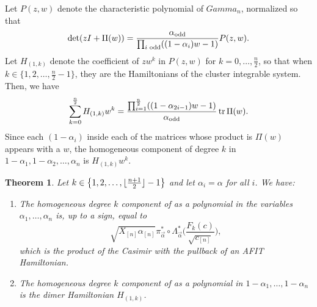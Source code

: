 \documentclass[10pt,a4paper]{amsart}
\numberwithin{equation}{section}
\newtheorem{Theorem}{Theorem}[section]
\DeclarePairedDelimiter\floor{\lfloor}{\rfloor}
\newcommand{\la}{\label}
\DeclareMathOperator{\tr}{tr}
\def\Gamma{Gamma}
\begin{document}
	
	Let $P(z,w)$ denote the characteristic polynomial of $\Gamma_n$, normalized so that
	\[
	\det (zI + \Pi(w))=\frac{ \alpha_{{\rm odd}}}{\prod_{i \text{ odd} }^{} ((1-\alpha_{i})w-1)} P(z,w).
	\]
	Let $H_{(1,k)}$ denote the coefficient of $z w^k$ in $P(z,w)$ for $k=0,\dots,\frac n 2 $, so that when $k \in \bigl\{1,2,\dots,\allowbreak\frac n 2 -1\bigr\}$, they are the Hamiltonians of the cluster integrable system. Then, we have
	\begin{align*}
		\sum_{k=0}^{\frac n 2} H_{(1,k)} w^k = \frac{\prod_{i=1}^{\frac n 2} ((1-\alpha_{2i-1})w-1)} {\alpha_{{\rm odd}}} \tr \Pi(w).
	\end{align*}
	Since each $(1-\alpha_i)$ inside each of the matrices whose product is $\Pi(w)$ appears with a $w$, the homogeneous component of degree $k$ in $1-\alpha_1,1-\alpha_2,\dots,\alpha_{n}$ is $H_{(1,k)} w^{k}$.
	\begin{Theorem}%
		Let $k \in \bigl\{1,2,\dots,\floor{\frac{n+1}{2} }-1\bigr\}$ and let $\alpha_i=\alpha$ for all $i$. We have:
		\begin{enumerate}\itemsep=0pt
			\item[$1.$] The homogeneous degree $k$ component of  as a polynomial in the variables $\alpha_1,\dots,\alpha_n$ is, up to a sign, equal to
\[
\sqrt{X_{[n]} \alpha_{[n]}} \pi_{\vec \alpha}^* \circ \Lambda_{\vec \alpha}^*\biggl(\frac{F_k(c)}{\sqrt{c_{[n]}}}\biggr),
\]
which is the product of the Casimir  with the pullback of an AFIT Hamiltonian.
			\item[$2.$] The homogeneous degree $k$ component of  as a polynomial in $1-\alpha_1,\dots,1-\alpha_n$ is the dimer Hamiltonian $H_{(1,k)}$.
		\end{enumerate}
	\end{Theorem}
	
	
	
\end{document}
